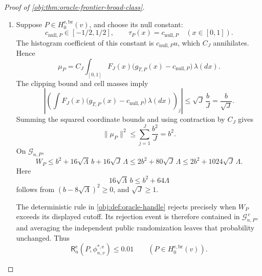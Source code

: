 \documentclass[11pt]{article}
\begin{document}
\begin{proof}[Proof of \cref{obj:thm:oracle-frontier-broad-class}]
\begin{enumerate}
Define the good event by
\[
\mathcal G_{n,P}
=
\left\{\mathcal D_n:
|W_P-\|\mu_P\|^2|
\le16\bigl(\sqrt\Lambda\,\|\mu_P\|+\sqrt J\,\Lambda\bigr)
\right\}.
\]
Its tolerance is strictly positive. Applying the second-moment tail bound gives
\[
\begin{aligned}
\mathbb P_{n,P}(\mathcal G_{n,P}^{\,c})
&\le
\frac{2\Lambda\|\mu_P\|^2+J\Lambda^2}
{256\bigl(\sqrt\Lambda\,\|\mu_P\|+\sqrt J\,\Lambda\bigr)^2}\\
&\le\frac1{128}<0.01.
\end{aligned}
\]
The last inequality uses the nonnegative cross term in the denominator.

\item Suppose \(P\in H_0^{\mathrm{e,br}}(v)\), and choose its null constant:
\[
c_{\mathrm{null},P}\in[-1/2,1/2],
\qquad
\tau_P(x)=c_{\mathrm{null},P}\quad(x\in[0,1]).
\]
The histogram coefficient of this constant is \(c_{\mathrm{null},P}u\), which \(C_J\) annihilates. Hence
\[
\mu_P
=C_J\int_{[0,1]}
F_J(x)\bigl(g_{T,P}(x)-c_{\mathrm{null},P}\bigr)\,\lambda(dx).
\]
The clipping bound and cell masses imply
\[
\left|
\left(\int F_J(x)
\bigl(g_{T,P}(x)-c_{\mathrm{null},P}\bigr)\,\lambda(dx)\right)_j
\right|
\le\sqrt J\,\frac bJ=\frac b{\sqrt J}.
\]
Summing the squared coordinate bounds and using contraction by \(C_J\) gives
\[
\|\mu_P\|^2\le
\sum_{j=1}^J\frac{b^2}{J}=b^2.
\]
On \(\mathcal G_{n,P}\),
\[
W_P
\le b^2+16\sqrt\Lambda\,b+16\sqrt J\,\Lambda
\le2b^2+80\sqrt J\,\Lambda
\le2b^2+1024\sqrt J\,\Lambda.
\]
Here
\[
16\sqrt\Lambda\,b\le b^2+64\Lambda
\]
follows from \((b-8\sqrt\Lambda)^2\ge0\), and \(\sqrt J\ge1\).

The deterministic rule in \cref{obj:def:oracle-handle} rejects precisely when \(W_P\) exceeds its displayed cutoff. Its rejection event is therefore contained in \(\mathcal G_{n,P}^{\,c}\), and averaging the independent public randomization leaves that probability unchanged. Thus
\[
\mathsf R_n^{\mathrm e}(P,\phi^{*,\mathrm e}_{n,v})
\le0.01
\qquad(P\in H_0^{\mathrm{e,br}}(v)).
\]


\end{enumerate}
\end{proof}
\end{document}
